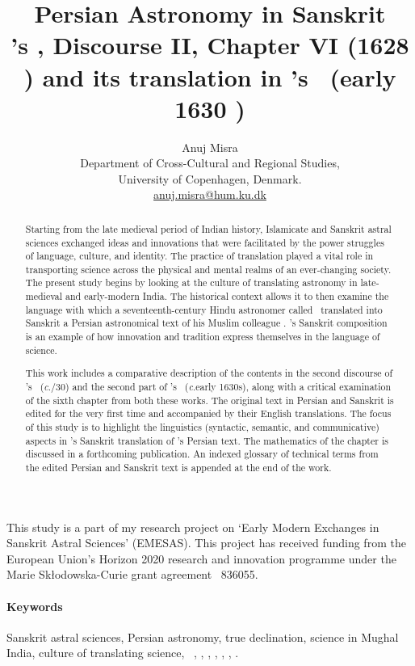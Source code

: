 \documentclass[10pt, a4paper, oneside]{memoir}
\title{Persian Astronomy in Sanskrit\\[5pt]
\MullaFarid's \ZijiShahJahani, Discourse II, Chapter VI (1628 \ce) and its translation in \Nityananda's \Siddhantasindhu\ (\circa early 1630 \ce)}
\author{Anuj Misra\\[10pt]

{\small Department of Cross-Cultural and Regional Studies,}\\{\small University of Copenhagen, Denmark.}\\{\small \url{anuj.misra@hum.ku.dk}}}
\date{}
\newcommand{\circa}{\emph{c}.\thinspace\nobreak }
\begin{document}
\sloppy
\sloppybottom
\maketitle
\thispagestyle{empty}
\vfill
This study is a part of my research project on `Early Modern Exchanges in Sanskrit Astral Sciences' (EMESAS). This project has received funding from the European Union’s Horizon 2020 research and innovation programme under the Marie Skłodowska-Curie grant agreement \textnumero\ 836055. 
\clearpage


\thispagestyle{empty}

\begin{abstract}
Starting from the late medieval period of Indian history, Islamicate and Sanskrit astral sciences exchanged ideas and innovations that were facilitated by the power struggles of language, culture, and identity. The practice of translation played a vital role in transporting science across the physical and mental realms of an ever-changing society. The present study begins by looking at the culture of translating astronomy in late-medieval and early-modern India. The historical context allows it to then examine the language with which a seventeenth-century Hindu astronomer called \Nityananda\ translated into Sanskrit a Persian astronomical text of his Muslim colleague \MullaFarid. \Nityananda's Sanskrit composition is an example of how innovation and tradition express themselves in the language of science. 

This work includes a comparative description of the contents in the second discourse of \MullaFarid's \ZijiShahJahani\ (\circa 1629/30) and the second part of \Nityananda's \Siddhantasindhu\ (\circa early 1630s), along with a critical examination of the sixth chapter from both these works. The original text in Persian and Sanskrit is edited for the very first time and accompanied by their English translations. The focus of this study is to highlight the linguistics (syntactic, semantic, and communicative) aspects in \Nityananda's Sanskrit translation of \MullaFarid's Persian text. The mathematics of the chapter is discussed in a forthcoming publication. An indexed glossary of technical terms from the edited Persian and Sanskrit text is appended at the end of the work.
\end{abstract}
\vfill
 \paragraph{Keywords} Sanskrit astral sciences, Persian astronomy, true declination, science in Mughal India, culture of translating science, \ganita\ \jyotisa, \Nityananda, \MullaFarid, \Sarvasiddhantaraja, \Siddhantasindhu, \ZijiShahJahani, \ZijUlughBeg. 
\clearpage
\tableofcontents*
\clearpage
\end{document}
